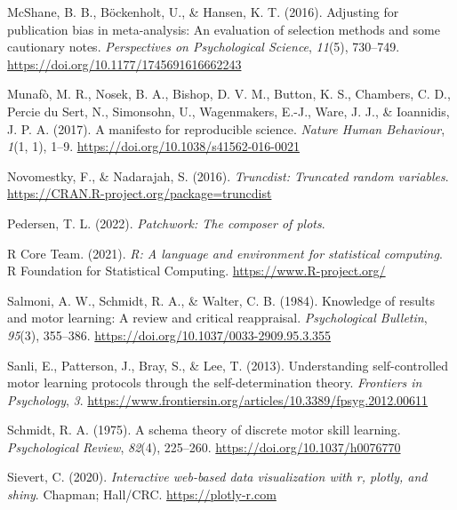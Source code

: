 \documentclass[
  man, donotrepeattitle,mask,floatsintext]{apa7}
\newlength{\cslhangindent}
\newlength{\cslentryspacingunit} %
\newenvironment{CSLReferences}[2] %
 {%
  \setlength{\parindent}{0pt}
  \ifodd #1
  \let\oldpar\par
  \def\par{\hangindent=\cslhangindent\oldpar}
  \fi
  \setlength{\parskip}{#2\cslentryspacingunit}
 }%
 {}
\begin{document}
\begin{CSLReferences}{1}{0}
\leavevmode{}%
McShane, B. B., Böckenholt, U., \& Hansen, K. T. (2016). Adjusting for publication bias in meta-analysis: An evaluation of selection methods and some cautionary notes. \emph{Perspectives on Psychological Science}, \emph{11}(5), 730--749. \url{https://doi.org/10.1177/1745691616662243}

\leavevmode{}%
Munafò, M. R., Nosek, B. A., Bishop, D. V. M., Button, K. S., Chambers, C. D., Percie du Sert, N., Simonsohn, U., Wagenmakers, E.-J., Ware, J. J., \& Ioannidis, J. P. A. (2017). A manifesto for reproducible science. \emph{Nature Human Behaviour}, \emph{1}(1, 1), 1--9. \url{https://doi.org/10.1038/s41562-016-0021}

\leavevmode{}%
Novomestky, F., \& Nadarajah, S. (2016). \emph{Truncdist: Truncated random variables}. \url{https://CRAN.R-project.org/package=truncdist}

\leavevmode{}%
Pedersen, T. L. (2022). \emph{Patchwork: The composer of plots}.

\leavevmode{}%
R Core Team. (2021). \emph{R: A language and environment for statistical computing}. R Foundation for Statistical Computing. \url{https://www.R-project.org/}

\leavevmode{}%
Salmoni, A. W., Schmidt, R. A., \& Walter, C. B. (1984). Knowledge of results and motor learning: A review and critical reappraisal. \emph{Psychological Bulletin}, \emph{95}(3), 355--386. \url{https://doi.org/10.1037/0033-2909.95.3.355}

\leavevmode{}%
Sanli, E., Patterson, J., Bray, S., \& Lee, T. (2013). Understanding self-controlled motor learning protocols through the self-determination theory. \emph{Frontiers in Psychology}, \emph{3}. \url{https://www.frontiersin.org/articles/10.3389/fpsyg.2012.00611}

\leavevmode{}%
Schmidt, R. A. (1975). A schema theory of discrete motor skill learning. \emph{Psychological Review}, \emph{82}(4), 225--260. \url{https://doi.org/10.1037/h0076770}

\leavevmode{}%
Sievert, C. (2020). \emph{Interactive web-based data visualization with r, plotly, and shiny}. Chapman; Hall/CRC. \url{https://plotly-r.com}


\end{CSLReferences}
\end{document}

